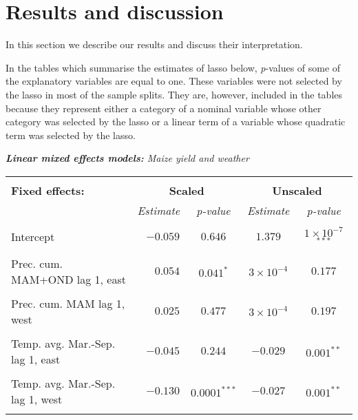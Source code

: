 \documentclass[a4paper,12pt]{article}
\begin{document}
\FloatBarrier
	\section{Results and discussion}\label{Results}
In this section we describe our results and discuss their interpretation.

In the tables which summarise the estimates of lasso below, \textit{p}-values of some of the explanatory variables are equal to one. These variables were not selected by the lasso in most of the sample splits. They are, however, included in the tables because they represent either a category of a nominal variable whose other category was selected by the lasso or a linear term of a variable whose quadratic term was selected by the lasso. 




{\centering
\begin{threeparttable}


\singlespacing
\caption{\textit{\textbf{Linear mixed effects models:} Maize yield and weather}}
 
\label{Peggy45} 
\centering
\begin{small}
\begin{tabular}{lrccc} 
\hline \vspace{-0.2cm} \\
  
  
  \multicolumn{1}{l}{\vspace{0.1cm}\textbf{Fixed effects:}}  &\multicolumn{2}{c}{\textbf{Scaled}}& \multicolumn{2}{c}{{\textbf{Unscaled\tnote{a}}}} \\
  
    \multicolumn{1}{l}{\vspace{0.1cm}}  &\textit{Estimate}&\textit{p-value}&\multicolumn{1}{c}{\textit{Estimate}}& \multicolumn{1}{c}{\textit{p-value}} \\
 \hline 
\hline
\\
\vspace{-0.2cm}Intercept&$-0.059$&$0.646$&$1.379$&$1\times10^{-7}$$^{***}$\\
  \\
\vspace{-0.2cm}Prec. cum. MAM+OND lag 1, east&$0.054$&$0.041^{*}$&$3\times10^{-4}$&$0.177$\\
  \\
  \vspace{-0.2cm}Prec. cum. MAM lag 1, west&$0.025$&$0.477$&$3\times10^{-4}$&$0.197$\\
  \\
  \vspace{-0.2cm}Temp. avg. Mar.-Sep. lag 1, east&$-0.045$&$0.244$&$-0.029$&$0.001^{**}$\\
  \\
    \vspace{-0.2cm}Temp. avg. Mar.-Sep. lag 1, west&$-0.130$&$0.0001^{***}$&$-0.027$&$0.001^{**}$\\
  \\
  

\end{tabular}
\end{small}
\end{threeparttable}}
\end{document}
